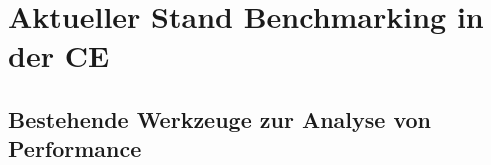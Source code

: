 \chapter{Aktueller Stand Benchmarking in der \acl{CE}}
\section{Bestehende Werkzeuge zur Analyse von Performance}
